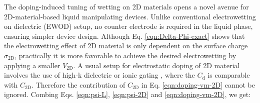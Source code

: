 \documentclass[journal=ancac3,manuscript=article,email=true]{achemso}
\begin{document}
The doping-induced tuning of wetting on 2D materials opens a novel
avenue for 2D-material-based liquid manipulating devices. Unlike
conventional electrowetting on dielectric (EWOD) setup, no counter
electrode is required in the liquid phase, ensuring simpler device
design. Although Eq. \ref{eqn:Delta-Phi-exact} shows that the
electrowetting effect of 2D material is only dependent on the surface
charge \(\sigma_{\mathrm{2D}}\), practically it is more favorable to
achieve the desired electrowetting by applying a smaller
\(V_{\mathrm{2D}}\). A usual setup for electrostatic doping of 2D
material involves the use of high-k dielectric or ionic gating
\cite{Das_2008,Radisavljevic_2011,Xu_2011,Newaz_2012}, where the
\(C_{\mathrm{d}}\) is comparable with \(C_{\mathrm{2D}}\). Therefore the
contribution of \(C_{\mathrm{2D}}\) in Eq. \ref{eqn:doping-vm-2D} cannot
be ignored. Combing Eqs. \ref{eqn:psi-L}, \ref{eqn:psi-2D} and
\ref{eqn:doping-vm-2D}, we get:
\end{document}
